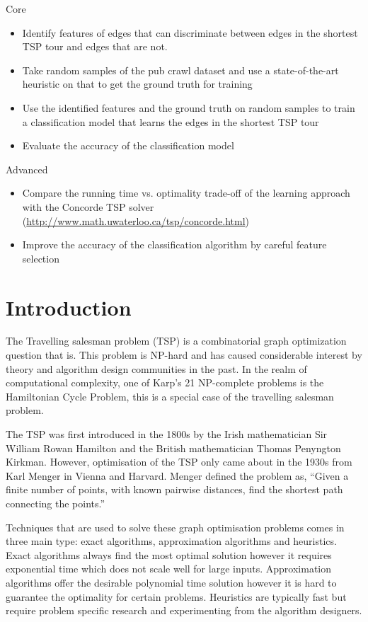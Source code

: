 \documentclass[]{UCD_CS_FYP_Report}
\begin{document}
\LARGE Core
\normalsize
\begin{itemize}
    \item Identify features of edges that can discriminate between edges in the shortest TSP tour and edges that are not.
    \item Take random samples of the pub crawl dataset and use a state-of-the-art heuristic on that to get the ground truth for training
    \item Use the identified features and the ground truth on random samples to train a classification model that learns the edges in the shortest TSP tour
    \item Evaluate the accuracy of the classification model
\end{itemize}
\LARGE Advanced
\normalsize
\begin{itemize}
    \item Compare the running time vs. optimality trade-off of the learning approach with the Concorde TSP solver (\url{http://www.math.uwaterloo.ca/tsp/concorde.html})
    \item Improve the accuracy of the classification algorithm by careful feature selection
\end{itemize}


\chapter{Introduction}
The Travelling salesman problem (TSP) is a combinatorial graph optimization question that is. This problem is NP-hard and has caused considerable interest by theory and algorithm design communities in the past. In the realm of computational complexity, one of Karp's 21 NP-complete problems is the Hamiltonian Cycle Problem, this is a special case of the travelling salesman problem.

The TSP was first introduced in the 1800s by the Irish mathematician Sir William Rowan Hamilton and the British mathematician Thomas Penyngton Kirkman. However, optimisation of the TSP only came about in the 1930s from Karl Menger in Vienna and Harvard. Menger defined the problem as, “Given a finite number of points, with known pairwise distances, find the shortest path connecting the points.”\cite{Menger}

Techniques that are used to solve these graph optimisation problems comes in three main type: exact algorithms, approximation algorithms and heuristics. Exact algorithms always find the most optimal solution however it requires exponential time which does not scale well for large inputs. Approximation algorithms offer the desirable polynomial time solution however it is hard to guarantee the optimality for certain problems. Heuristics are typically fast but require problem specific research and experimenting from the algorithm designers.
\end{document}
